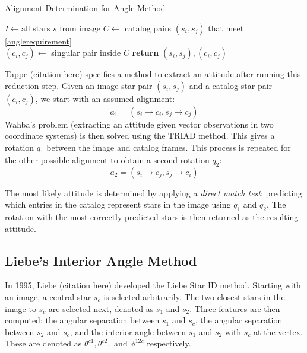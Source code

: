 
\begin{algorithm}[H]
\caption{Alignment Determination for Angle Method}
\label{Angle Alignment}
\begin{algorithmic}[1]

\State $I \gets \text{all stars } s \text{ from image}$
\State $C \gets $ catalog pairs $(s_i, s_j)$ that meet \eqref{anglerequirement}
\\
\State $(c_i, c_j) \gets $ singular pair inside $C$
\State \textbf{return} $(s_i, s_j), (c_i, c_j)$
\EndIf
\EndFor
\EndFor
\EndProcedure
\end{algorithmic}
\end{algorithm}

Tappe (citation here) specifies a method to extract an attitude after running this reduction step. Given an image star pair $(s_i, s_j)$ and a catalog star pair $(c_i, c_j)$, we start with an assumed alignment:
\begin{equation}
a_1 = (s_i \rightarrow c_i, s_j \rightarrow c_j)
\end{equation}
Wahba's problem (extracting an attitude given vector observations in two coordinate systems) is then solved using the TRIAD method. This gives a rotation $q_1$ between the image and catalog frames. This process is repeated for the other possible alignment to obtain a second rotation $q_2$:
\begin{equation}
a_2 = (s_i \rightarrow c_j, s_j \rightarrow c_i)
\end{equation}

The most likely attitude is determined by applying a \textit{direct match test}: predicting which entries in the catalog represent stars in the image using $q_1$ and $q_2$. The rotation with the most correctly predicted stars is then returned as the resulting attitude. 

\subsection{Liebe's Interior Angle Method}
In 1995, Liebe (citation here) developed the Liebe Star ID method. Starting with an image, a central star $s_c$ is selected arbitrarily. The two closest stars in the image to $s_c$ are selected next, denoted as $s_1$ and $s_2$. Three features are then computed: the angular separation between $s_1$ and $s_c$, the angular separation between $s_2$ and $s_c$, and the interior angle between $s_1$ and $s_2$ with $s_c$ at the vertex. These are denoted as $\theta^{c1}, \theta^{c2},$ and $\phi^{12c}$ respectively. 

